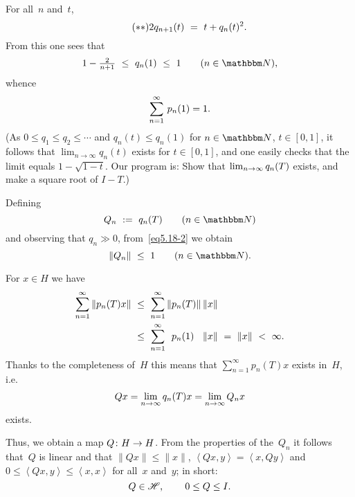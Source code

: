 \documentclass[main.tex]{subfiles}
\begin{document}
\begin{psec}{5.18}
\begin{enumerate}
For all~$n$ and~$t$,
\begin{equation*}
\tag{$**$} \label{eq5.18-3}
2 q_{n+1}(t)\ =\ t+q_n(t)^2\text{.}
\end{equation*}
From this one sees that
\begin{equation*}
1-{\textstyle\frac{2}{n+1}}\ \leq\ q_n(1)\ \leq\ 1
\qquad(n\in \N)\htam{,}
\end{equation*}
whence
\begin{equation*}
\sum_{n=1}^{\infty}\, p_n(1)=1\text{.}
\end{equation*}
(As $0\leq q_1\leq q_2\leq \dotsb$ 
and $q_n(t)\leq q_n(1)$ for $n\in\N$, $t\in[0,1]$,
it follows that $\lim_{n\rightarrow\infty} q_n(t)$
exists for $t\in[0,1]$,
and one easily checks that the limit equals $1-\sqrt{1-t}$.
Our program is:
Show that $\lim_{n\rightarrow\infty} q_n(T)$ exists,
and make a square root of $I-T$.)

Defining
\begin{equation*}
Q_n\ :=\ q_n(T)\qquad(n\in\N)
\end{equation*}
and observing that $q_n\gg 0$,
from~\eqref{eq5.18-2} we obtain
\begin{equation*}
\|Q_n\|\ \leq\ 1\qquad (n\in \N)\htam{.}
\end{equation*}

For $x\in H$ we have
\begin{alignat*}{2}
\sum_{n=1}^\infty \|p_n(T)x\|\ 
&\leq\ \sum_{n=1}^\infty \|p_n(T)\|\,\|x\|\\
&\leq\ \sum_{n=1}^\infty \phantom{\|}
p_n(\lsub{1)}{T)}\phantom{\|}\,\|x\|\ =\ \|x\|\ <\ \infty\htam{.}
\end{alignat*}
Thanks to the completeness of~$H$
this means that $\sum_{n=1}^{\infty} p_n(T) x$
exists in~$H$, i.e. 
\begin{equation*}
Qx=\lim_{n\rightarrow\infty} q_n(T)x=\lim_{n\rightarrow\infty}Q_n x
\end{equation*}
exists.

Thus,
we obtain a map $Q\colon H\rightarrow H$.
From the properties of the~$Q_n$
it follows that~$Q$ is linear
and that $\|Qx\|\leq\|x\|$,
$\left<Qx,y\right>=\left<x,Qy\right>$
and $0\leq\left<Qx,y\right>\leq\left<x,x\right>$
for all~$x$ and~$y$;
in short:
\begin{equation*}
Q\in\mathscr H\text{, }\qquad 0\leq Q\leq I\text{.}
\end{equation*}


\end{enumerate}
\end{psec}
\end{document}

